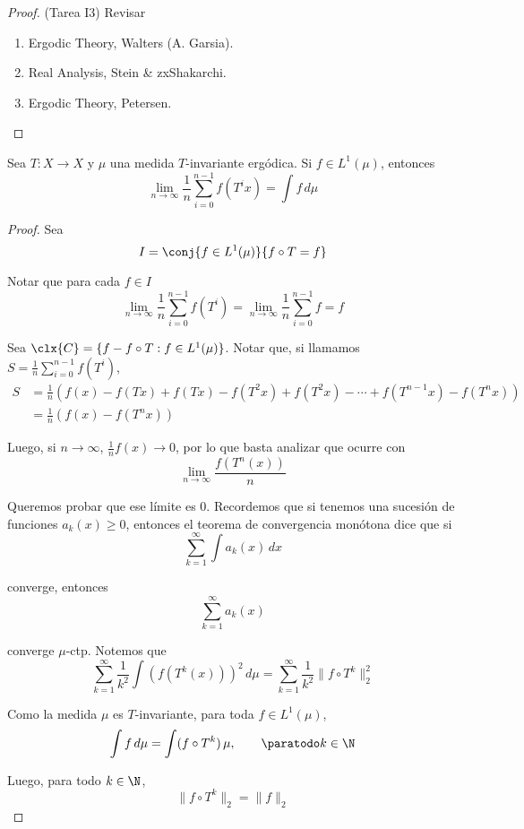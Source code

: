 \documentclass[	docname= Sistemas\ Din\'amicos,
				finished=1,
				semester=1,
				year=2017,
				professor=Godofredo\ Iommi,
				sigla=MAT2565]{apunte}
\begin{document}
\begin{proof} (Tarea I3) Revisar 
	\begin{enumerate}
		\item Ergodic Theory, Walters (A. Garsia).
		\item Real Analysis, Stein \& zxShakarchi.
		\item Ergodic Theory, Petersen.
	\end{enumerate}
\end{proof}


\begin{teo}[Birkhoff] Sea $T: X \to X$ y $\mu$ una medida $T$-invariante ergódica. Si $f \in L^{1}(\mu)$, entonces
	$$\lim_{n \to \infty} \frac{1}{n} \sum_{i=0}^{n-1} f(T^{i}x) = \int f \, d\mu$$ 
\end{teo}

\begin{proof} Sea
	$$I = \conj{f \in L^{1}(\mu)}{f \circ T = f}$$

Notar que para cada $f \in I$
	$$\lim_{n \to \infty} \frac{1}{n} \sum_{i=0}^{n-1} f(T^{i}) 
		= \lim_{n \to \infty} \frac{1}{n} \sum_{i=0}^{n-1} f 
		= f
	$$

Sea $\clx{C} = \{f - f \circ T : f \in L^{1}(\mu)\}$. Notar que, si llamamos $S = \frac{1}{n} \sum_{i=0}^{n-1} f(T^{i})$,
	\begin{align*}
		S
			&=	\frac{1}{n} (f(x) - f(Tx) + f(Tx) - f(T^{2}x) + f(T^{2}x) - \cdots + f(T^{n-1}x) - f(T^{n}x))	\\
			&=	\frac{1}{n}(f(x) - f(T^{n}x))
	\end{align*}

Luego, si $n \to \infty$, $\frac{1}{n} f(x) \to 0$, por lo que basta analizar que ocurre con
	$$\lim_{n \to \infty} \frac{f(T^{n}(x))}{n}$$

Queremos probar que ese límite es 0. Recordemos que si tenemos una sucesión de funciones $a_{k}(x) \geq 0$, entonces el teorema de convergencia monótona dice que si
	$$\sum_{k=1}^{\infty} \int a_{k}(x) \, dx$$

converge, entonces
	$$\sum_{k=1}^{\infty} a_{k}(x)$$

converge $\mu$-ctp. Notemos que
	$$\sum_{k=1}^{\infty} \frac{1}{k^{2}} \int (f(T^{k}(x)))^{2} \, d\mu
		=	\sum_{k=1}^{\infty} \frac{1}{k^{2}} \| f \circ T^{k}\|^{2}_{2}
	$$

Como la medida $\mu$ es $T$-invariante, para toda $f \in L^{1}(\mu)$,
	$$\int f \, d\mu = \int (f \circ T^{k}) \, \mu, \qquad \paratodo k \in \N$$

Luego, para todo $k \in \N$,
	$$\|f \circ T^{k}\|_{2} = \|f\|_{2}$$


\end{proof}
\end{document}
